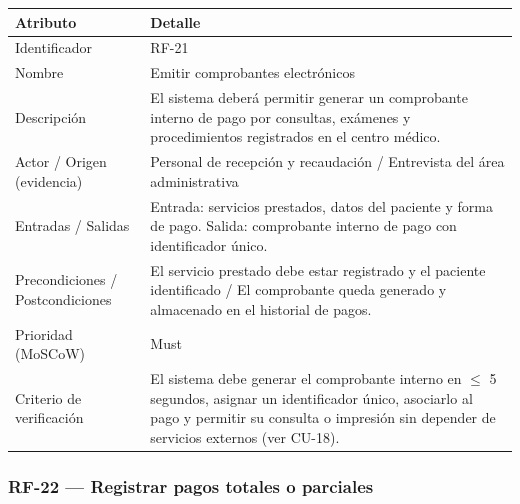 \documentclass[11pt,a4paper]{article}
\begin{document}
	\begin{longtable}{p{} p{}}
		
		\toprule
		\textbf{Atributo} & \textbf{Detalle} \\
		\midrule
		\endhead
		
		Identificador & RF-21 \\
		Nombre & Emitir comprobantes electrónicos \\
		Descripción & El sistema deberá permitir generar un comprobante interno de pago por consultas, exámenes y procedimientos registrados en el centro médico. \\
		Actor / Origen (evidencia) & Personal de recepción y recaudación / Entrevista del área administrativa \\
		Entradas / Salidas & Entrada: servicios prestados, datos del paciente y forma de pago. Salida: comprobante interno de pago con identificador único. \\
		Precondiciones / Postcondiciones & El servicio prestado debe estar registrado y el paciente identificado / El comprobante queda generado y almacenado en el historial de pagos. \\
		Prioridad (MoSCoW) & Must \\
		Criterio de verificación & El sistema debe generar el comprobante interno en \(\leq\) 5 segundos, asignar un identificador único, asociarlo al pago y permitir su consulta o impresión sin depender de servicios externos (ver CU-18). \\
		\bottomrule
	\end{longtable}
	
	\subsubsection{RF-22 --- Registrar pagos totales o parciales}
	
\end{document}
